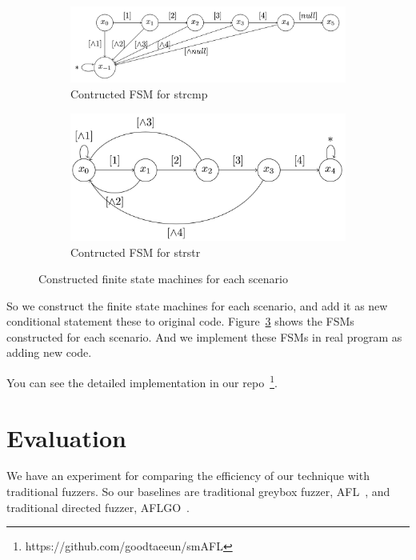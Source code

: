\documentclass[12pt]{sigplanconf}
\begin{document}
\begin{figure}[h]
    \begin{subfigure}[t]{0.45\textwidth}
        \includegraphics[width=\textwidth]{figure/strcmp.png}
        \caption{Contructed FSM for strcmp}
        \label{fig:fsm-strcmp}
    \end{subfigure}
    \begin{subfigure}[t]{0.45\textwidth}
        \includegraphics[width=\textwidth]{figure/strstr.png}
        \caption{Contructed FSM for strstr}
        \label{fig:fsm-strstr}
    \end{subfigure}
    \caption{Constructed finite state machines for each scenario}
    \label{fig:fsm} 
\end{figure}

So we construct the finite state machines for each scenario, and add it as new conditional statement these to original code.
Figure~\ref{fig:fsm} shows the FSMs constructed for each scenario. And we implement these FSMs in real program as adding
new code.

You can see the detailed implementation in our repo~\footnote{https://github.com/goodtaeeun/smAFL}.

\section{Evaluation}
We have an experiment for comparing the efficiency of our technique with traditional fuzzers. So our baselines are traditional
greybox fuzzer, AFL~\cite{aflfuzz}, and traditional directed fuzzer, AFLGO~\cite{bohme:ccs:2017}.
\end{document}
